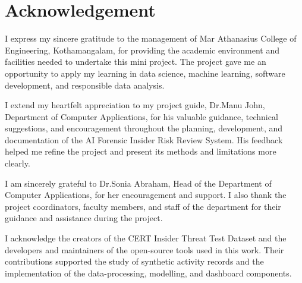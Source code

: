 \renewcommand{\cftlottitlefont}{\hfill\bfseries\fontsize{16}{20}\selectfont}\renewcommand{\cftafterlottitle}{\hfill}
\renewcommand{\cftloftitlefont}{\hfill\bfseries\fontsize{16}{20}\selectfont}\renewcommand{\cftafterloftitle}{\hfill}
\pagestyle{frontmatter}
\titleformat{\chapter}[block]{\bfseries\fontsize{16}{20}\selectfont\centering}{}{0pt}{}
\renewcommand{\cfttoctitlefont}{\hfill\bfseries\fontsize{16}{20}\selectfont}\renewcommand{\cftaftertoctitle}{\hfill}

\chapter*{Acknowledgement}
I express my sincere gratitude to the management of Mar Athanasius
College of Engineering, Kothamangalam, for providing the academic
environment and facilities needed to undertake this mini project. The
project gave me an opportunity to apply my learning in data science,
machine learning, software development, and responsible data analysis.

I extend my heartfelt appreciation to my project guide, Dr.Manu John,
Department of Computer Applications, for his valuable guidance,
technical suggestions, and encouragement throughout the planning,
development, and documentation of the AI Forensic Insider Risk Review
System. His feedback helped me refine the project and present its
methods and limitations more clearly.

I am sincerely grateful to Dr.Sonia Abraham, Head of the Department of
Computer Applications, for her encouragement and support. I also thank
the project coordinators, faculty members, and staff of the department
for their guidance and assistance during the project.

I acknowledge the creators of the CERT Insider Threat Test Dataset and
the developers and maintainers of the open-source tools used in this
work. Their contributions supported the study of synthetic activity
records and the implementation of the data-processing, modelling, and
dashboard components.

